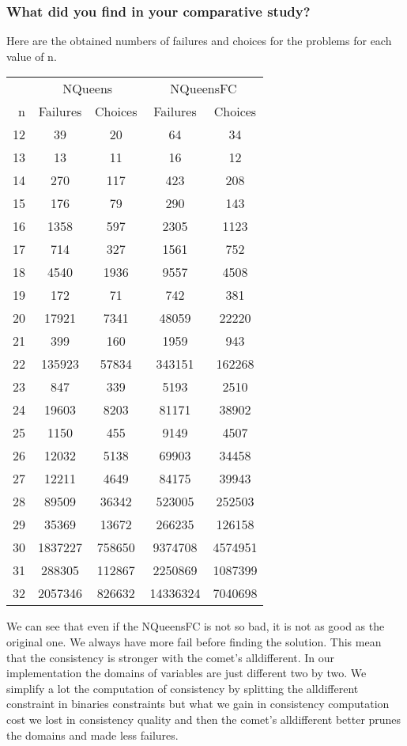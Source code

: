 \documentclass{eplDoc}
\begin{document}
\subsubsection{What did you find in your comparative study?}
Here are the obtained numbers of failures and choices for the problems for each value of n. 
\begin{center}
\begin{tabular}{|r|cc|cc|}
\hline
 & \multicolumn{2}{c}{NQueens} & \multicolumn{2}{|c|}{NQueensFC} \\
 n & Failures & Choices & Failures & Choices \\ 
\hline
12 & 39 & 20 &               64 & 34 \\ 
13 & 13 & 11 &               16 & 12 \\ 
14 & 270 & 117 &             423 & 208 \\ 
15 & 176 & 79 &              290 & 143 \\ 
16 & 1358 & 597 &            2305 & 1123 \\ 
17 & 714 & 327 &             1561 & 752 \\ 
18 & 4540 & 1936 &           9557 & 4508 \\ 
19 & 172 & 71 &              742 & 381 \\ 
20 & 17921 & 7341 &          48059 & 22220 \\ 
21 & 399 & 160 &             1959 & 943 \\ 
22 & 135923 & 57834 &        343151 & 162268 \\ 
23 & 847 & 339 &             5193 & 2510 \\ 
24 & 19603 & 8203 &          81171 & 38902 \\ 
25 & 1150 & 455 &            9149 & 4507 \\ 
26 & 12032 & 5138 &          69903 & 34458 \\ 
27 & 12211 & 4649 &          84175 & 39943 \\ 
28 & 89509 & 36342 &         523005 & 252503 \\ 
29 & 35369 & 13672 &         266235 & 126158 \\ 
30 & 1837227 & 758650 &      9374708 & 4574951 \\ 
31 & 288305 & 112867 &       2250869 & 1087399 \\ 
32 & 2057346 & 826632 &      14336324 & 7040698 \\ 
\hline
\end{tabular}
\end{center}

We can see that even if the NQueensFC is not so bad, it is not as good as the original one.  We always have more fail before finding the solution.  This mean that the consistency is stronger with the comet's alldifferent.  In our implementation the domains of variables are just different two by two.  We simplify a lot the computation of consistency by splitting the alldifferent constraint in binaries constraints but what we gain in consistency computation cost we lost in consistency quality and then the comet's alldifferent better prunes the domains and made less failures.
\end{document}
